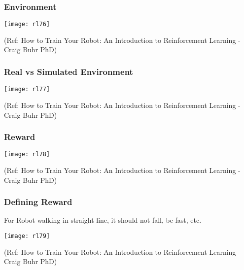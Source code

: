 \begin{frame}[fragile]\frametitle{Environment}


\begin{center}
\texttt{[image: rl76]}
\end{center}

{\tiny (Ref: How to Train Your Robot: An Introduction to Reinforcement Learning - Craig Buhr PhD)}

\end{frame}

\begin{frame}[fragile]\frametitle{Real vs Simulated Environment}


\begin{center}
\texttt{[image: rl77]}
\end{center}

{\tiny (Ref: How to Train Your Robot: An Introduction to Reinforcement Learning - Craig Buhr PhD)}

\end{frame}

\begin{frame}[fragile]\frametitle{Reward}


\begin{center}
\texttt{[image: rl78]}
\end{center}

{\tiny (Ref: How to Train Your Robot: An Introduction to Reinforcement Learning - Craig Buhr PhD)}

\end{frame}

\begin{frame}[fragile]\frametitle{Defining Reward}

For Robot walking in straight line, it should not fall, be fast, etc.

\begin{center}
\texttt{[image: rl79]}
\end{center}

{\tiny (Ref: How to Train Your Robot: An Introduction to Reinforcement Learning - Craig Buhr PhD)}

\end{frame}



